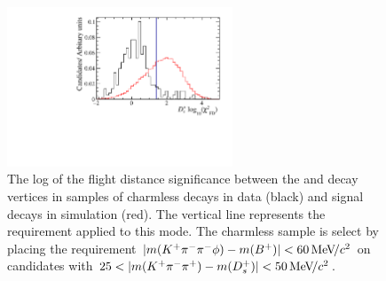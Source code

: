 \begin{figure}[!h]
    \centering
        \includegraphics[width=0.6\textwidth]{figs/Selection/Charmless_Comparison_B2DsPhi_Ds2KPiPi_log10_D_FDCHI2_ORIVX.pdf}
        \caption{The log of the flight distance significance between the \Bp and \Dsp decay vertices in samples of charmless \decay{\Bp}{\Kp\pim\pip\phiz} decays in data (black) and \decay{\Bp}{(\decay{\Dsp}{\Kp\pim\pip})\phiz} signal decays in simulation (red). The vertical line represents the requirement applied to this mode. The charmless \decay{\Bp}{\Kp\pim\pip\phiz} sample is select by placing the requirement $|m({{K}^+}{{\pi}^-}{{\pi}^-}\phi)-m({{{B}^+}})|<60{\mathrm{\,Me\kern -0.1em V\!/}c^2}$ on \decay{\Bp}{(\decay{\Dsp}{\Kp\pim\pip})\phiz} candidates with $25 < |m({{K}^+}{{\pi}^-}{{\pi}^+}) - m({{D}^+_{s}})| < 50{\mathrm{\,Me\kern -0.1em V\!/}c^2} $.}
    \label{fig:Selection_FDCHI2}   
\end{figure}


